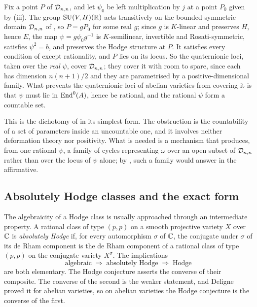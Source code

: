 \begin{remark}%
\label{rem:onlyrational}
Fix a point $P$ of $\mathcal{D}_{n,n}$, and let $\psi_{0}$ be left multiplication by
$j$ at a point $P_{0}$ given by (iii). The group
$\operatorname{SU}(V,H)(\mathbb{R})$ acts transitively on the bounded symmetric domain $\mathcal{D}_{n,n}$
of , so $P=gP_{0}$ for some real $g$; since $g$ is
$K$-linear and preserves $H$, hence $E$, the map
$\psi=g\psi_{0}g^{-1}$ is $K$-semilinear, invertible and Rosati-symmetric,
satisfies $\psi^{2}=b$, and preserves the Hodge structure at $P$. It
satisfies every condition of  except rationality, and
$P$ lies on its locus. So the quaternionic loci, taken over the \emph{real}
$\psi$, cover $\mathcal{D}_{n,n}$; they cover it with room to spare, since each has
dimension $n(n+1)/2$ and they are parametrised by a positive-dimensional
family. What prevents the quaternionic loci of abelian varieties from
covering it is that $\psi$ must lie in $\operatorname{End}^{0}(A)$, hence be rational, and
the rational $\psi$ form a countable set.

This is the dichotomy of  in its simplest form. The
obstruction is the countability of a set of parameters inside an uncountable
one, and it involves neither deformation theory nor positivity. What is
needed is a mechanism that produces, from one rational $\psi$, a family of
cycles representing $\omega$ over an open subset of $\mathcal{D}_{n,n}$ rather than
over the locus of $\psi$ alone; by , such a family
would answer  in the affirmative.
\end{remark}

\subsection{Absolutely Hodge classes and the exact form}\label{ssec:exactform}

The algebraicity of a Hodge class is usually approached through an
intermediate property. A rational class of type $(p,p)$ on a smooth
projective variety $X$ over $\mathbb{C}$ is \emph{absolutely Hodge} if, for every
automorphism $\sigma$ of $\mathbb{C}$, the conjugate under $\sigma$ of its de Rham
component is the de Rham component of a rational class of type $(p,p)$ on the
conjugate variety $X^{\sigma}$. The implications
\begin{equation}\label{eq:threechain}
  \text{algebraic}
  \;\Longrightarrow\;
  \text{absolutely Hodge}
  \;\Longrightarrow\;
  \text{Hodge}
\end{equation}
are both elementary. The Hodge conjecture asserts the converse of their
composite. The converse of the second is the weaker statement, and Deligne
proved it for abelian varieties, so on abelian varieties the Hodge conjecture
is the converse of the first.

